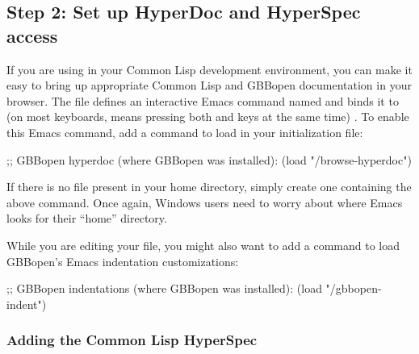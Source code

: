 \documentclass[10pt,twoside,english,pdftex]{article}
\begin{document}
\subsection*{Step 2: Set up  HyperDoc and HyperSpec access}

%
If you are using
 in your Common
Lisp development environment, you can make it easy to bring up appropriate
Common Lisp and GBBopen documentation in your browser.  The file
 defines an interactive
Emacs command named  and binds it to
 (on most keyboards,  means pressing
both  and  keys at the same time) .  To enable this Emacs
command, add a command to load
 in your 
initialization file:
%
\W\supp
\begin{example}
  ;; GBBopen hyperdoc (where GBBopen was installed):
  (load "/browse-hyperdoc")
\end{example}

If there is no  file present in your home directory, simply
create one containing the above command. Once again, Windows users need to
worry about where Emacs looks for their ``home'' directory.

While you are editing your  file, you might also want to add a
command to load GBBopen's Emacs indentation customizations:
%
\W\supp
\begin{example}
  ;; GBBopen indentations (where GBBopen was installed):
  (load "/gbbopen-indent")
\end{example}


\subsubsection*{Adding the Common Lisp HyperSpec}
\end{document}
